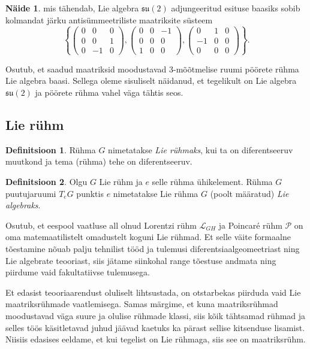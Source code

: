 \documentclass[a4paper,12pt]{article}
\theoremstyle{plain}
\theoremstyle{definition}
\newtheorem{definitsioon}{Definitsioon}[section]
\newtheorem{naide}{Näide}[section]
\numberwithin{equation}{section}
\def\L{{\mathcal L}}
\def\P{{\mathcal P}}
\def\su2{{\mathfrak{ su}\left(2\right)}}
\begin{document}
\begin{naide}
mis tähendab, Lie algebra $\su2$ adjungeeritud esituse baasiks sobib kolmandat järku antisümmeetriliste maatriksite süsteem 
\[\left\lbrace \begin{pmatrix}
0 & 0 & 0 \\
0 & 0 & 1 \\
0 & -1 & 0
\end{pmatrix}, \begin{pmatrix}
0 & 0 & -1 \\
0 & 0 & 0 \\
1 & 0 & 0
\end{pmatrix}, \begin{pmatrix}
0 & 1 & 0 \\
-1 & 0 & 0 \\
0 & 0 & 0
\end{pmatrix} \right\rbrace.\]
\end{naide}

Osutub, et saadud maatriksid moodustavad $3$-mõõtmelise ruumi pöörete rühma Lie algebra baasi. Sellega oleme sisuliselt näidanud, et tegelikult on Lie algebra $\su2$ ja pöörete rühma vahel väga tähtis seos.

\subsection{Lie rühm}

\begin{definitsioon}
Rühma $G$ nimetatakse \emph{Lie rühmaks}, kui ta on diferentseeruv muutkond ja tema (rühma) tehe on diferentseeruv.
\end{definitsioon}

\begin{definitsioon}
Olgu $G$ Lie rühm ja $e$ selle rühma ühikelement. Rühma $G$ puutujaruumi $T_e G$ punktis $e$ nimetatakse Lie rühma $G$ (poolt määratud) \emph{Lie algebraks}.
\end{definitsioon}

Osutub, et eespool vaatluse all olnud Lorentzi rühm $\L_{GH}$ ja Poincar\'e rühm $\P$ on oma matemaatilistelt omadustelt koguni Lie rühmad. Et selle väite formaalne tõestamine nõuab palju tehnilist tööd ja tulemusi diferentsiaalgeomeetriast ning Lie algebrate teooriast, siis jätame siinkohal range tõestuse andmata ning piirdume vaid fakultatiivse tulemusega.

Et edasist teooriaarendust oluliselt lihtsustada, on otstarbekas piirduda vaid Lie maatriksrühmade vaatlemisega. Samas märgime, et kuna maatriksrühmad moodustavad väga suure ja olulise rühmade klassi, siis kõik tähtsamad rühmad ja selles töös käsitletavad juhud jäävad kaetuks ka pärast sellise kitsenduse lisamist. Niisiis edasises eeldame, et kui tegelist on Lie rühmaga, siis see on maatriksrühm.
\end{document}
